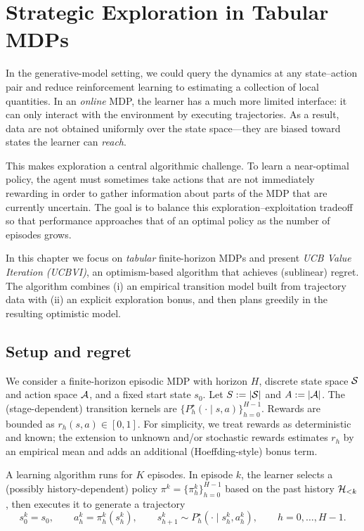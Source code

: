 \chapter{Strategic Exploration in Tabular MDPs}
\label{chap:tabular_exploration}

In the generative-model setting, we could query the dynamics at any state--action
pair and reduce reinforcement learning to estimating a collection of local
quantities. In an \emph{online} MDP, the learner has a much more limited interface:
it can only interact with the environment by executing trajectories. As a result,
data are not obtained uniformly over the state space---they are biased toward
states the learner can \emph{reach}.

This makes exploration a central algorithmic challenge. To learn a near-optimal
policy, the agent must sometimes take actions that are not immediately rewarding
in order to gather information about parts of the MDP that are currently uncertain.
The goal is to balance this exploration--exploitation tradeoff so that performance
approaches that of an optimal policy as the number of episodes grows.

In this chapter we focus on \emph{tabular} finite-horizon MDPs and present
\emph{UCB Value Iteration (UCBVI)}, an optimism-based algorithm that achieves
(sublinear) regret. The algorithm combines (i) an empirical transition model
built from trajectory data with (ii) an explicit exploration bonus, and then
plans greedily in the resulting optimistic model.

\section{Setup and regret}
\label{sec:tabular_setup}

We consider a finite-horizon episodic MDP with horizon $H$, discrete state space
$\mathcal{S}$ and action space $\mathcal{A}$, and a fixed start state $s_0$.
Let $S := |\mathcal{S}|$ and $A := |\mathcal{A}|$.
The (stage-dependent) transition kernels are $\{P_h^\star(\cdot\mid s,a)\}_{h=0}^{H-1}$.
Rewards are bounded as $r_h(s,a)\in[0,1]$.
For simplicity, we treat rewards as deterministic and known; the extension to unknown
and/or stochastic rewards estimates $r_h$ by an empirical mean and adds an additional
(Hoeffding-style) bonus term.

A learning algorithm runs for $K$ episodes. In episode $k$, the learner selects
a (possibly history-dependent) policy
$\pi^k=\{\pi_h^k\}_{h=0}^{H-1}$ based on the past history $\mathcal{H}_{<k}$, then executes it
to generate a trajectory
\[
s_0^k=s_0,\qquad a_h^k=\pi_h^k(s_h^k),\qquad s_{h+1}^k\sim P_h^\star(\cdot\mid s_h^k,a_h^k),
\qquad h=0,\dots,H-1.
\]

